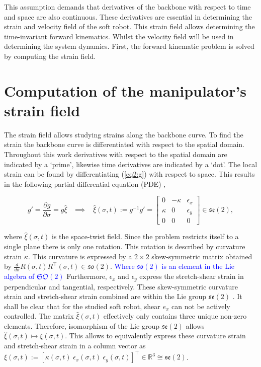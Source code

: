 This assumption demands that derivatives of the backbone with respect to time and space are also continuous. These derivatives are essential in determining the strain and velocity field of the soft robot. This strain field allows determining the time-invariant forward kinematics. Whilst the velocity field will be used in determining the system dynamics. First, the forward kinematic problem is solved by computing the strain field.



\section{Computation of the manipulator's strain field}

The strain field allows studying strains along the backbone curve. To find the strain the backbone curve is differentiated with respect to the spatial domain. Throughout this work derivatives with respect to the spatial domain are indicated by a `prime', likewise time derivatives are indicated by a `dot'. The local strain can be found by differentiating (\ref{eq2:g}) with respect to space. This results in the following partial differential equation (PDE) \cite{Caasenbrood2020}, 

\begin{equation}
   g' = \frac{\partial g}{\partial \sigma} = g \hat{\xi} \hspace{10pt} \implies \hspace{10pt}  \hat{\xi}(\sigma,t) := g^{-1}g' = \begin{bmatrix} 0 & -\kappa & \epsilon_x  \\ \kappa & 0 & \epsilon_y \\ 0 & 0 & 0 \end{bmatrix} \in  \mathfrak{se}(2),
    \label{eq2:dgdsigma}
\end{equation}

where $\hat{\xi}(\sigma,t)$ is the space-twist field. Since the problem restricts itself to a single plane there is only one rotation. This rotation is described by curvature strain $\kappa$. This curvature is expressed by a $2 \times 2$ skew-symmetric matrix obtained by $\frac{d}{d\sigma}R(\sigma,t)R^\top(\sigma,t) \in \mathfrak{so}(2)$. \textcolor{blue}{Where $\mathfrak{so}(2)$ is an element in the Lie algebra of $\mathfrak{SO}(2)$} Furthermore, $\epsilon_x$ and $\epsilon_y$ express the stretch-shear strain in perpendicular and tangential, respectively. These skew-symmetric curvature strain and stretch-shear strain combined are within the Lie group $\mathfrak{se}(2)$ \cite{Sola2018}. It shall be clear that for the studied soft robot, shear $e_x$ can not be actively controlled. The matrix $\hat{\xi}(\sigma,t)$ effectively only contains three unique non-zero elements. Therefore, isomorphism of the Lie group $\mathfrak{se}(2)$ allows $\hat{\xi}(\sigma,t) \longmapsto \xi(\sigma,t)$. This allows to equivalently express these curvature strain and stretch-shear strain in a column vector as $\xi(\sigma,t):= [\kappa(\sigma,t) \hspace{3pt} \epsilon_x(\sigma,t) \hspace{3pt} \epsilon_y(\sigma,t) ]^\top \in \mathbb{R}^3 \cong \mathfrak{se}(2)$.

